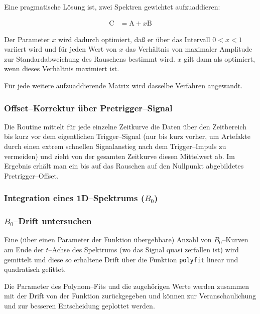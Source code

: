 \documentclass{article}
\newcommand{\vect}[1]{\boldsymbol{\mathrm #1}}
\newcommand{\func}[1]{\texttt{#1}}
\begin{document}
Eine pragmatische Lösung ist, zwei Spektren gewichtet aufzuaddieren:

\begin{align*}
	\vect{C} &= \vect{A} + x \vect{B}
\end{align*}

Der Parameter $x$ wird dadurch optimiert, daß er über das Intervall $0 < x < 1$ 
variiert wird und für jeden Wert von $x$ das Verhältnis von maximaler Amplitude 
zur Standardabweichung des Rauschens bestimmt wird. $x$ gilt dann als 
optimiert, wenn dieses Verhältnis maximiert ist.

Für jede weitere aufzuaddierende Matrix wird dasselbe Verfahren angewandt.


\subsubsection{Offset--Korrektur über Pretrigger--Signal}

Die Routine mittelt für jede einzelne Zeitkurve die Daten über den Zeitbereich 
bis kurz vor dem eigentlichen Trigger--Signal (nur bis kurz vorher, um 
Artefakte durch einen extrem schnellen Signalanstieg nach dem Trigger--Impuls 
zu vermeiden) und zieht von der gesamten Zeitkurve diesen Mittelwert ab. Im 
Ergebnis erhält man ein bis auf das Rauschen auf den Nullpunkt abgebildetes 
Pretrigger--Offset.


\subsubsection{Integration eines 1D--Spektrums ($B_0$)}


\subsubsection{$B_0$--Drift untersuchen}

Eine (über einen Parameter der Funktion übergebbare) Anzahl von $B_0$--Kurven 
am Ende der $t$--Achse des Spektrums (wo das Signal quasi zerfallen ist) wird 
gemittelt und diese so erhaltene Drift über die Funktion \func{polyfit} linear 
und quadratisch gefittet.

Die Parameter des Polynom--Fits und die zugehörigen Werte werden zusammen mit 
der Drift von der Funktion zurückgegeben und können zur Veranschaulichung und 
zur besseren Entscheidung geplottet werden.
\end{document}
